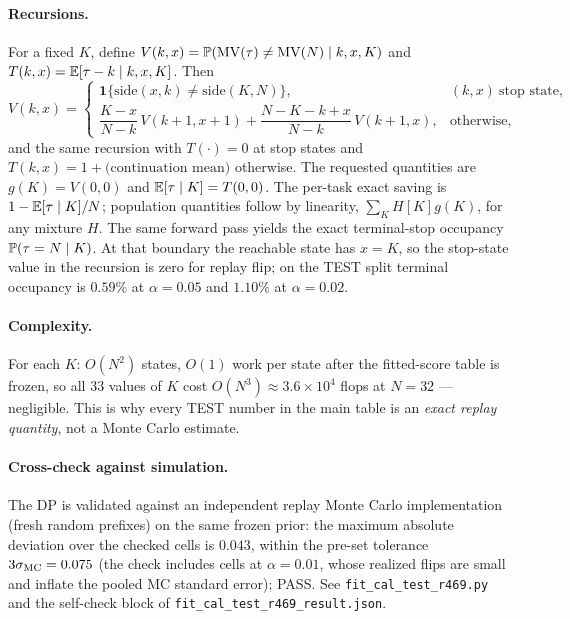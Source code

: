 \paragraph{Recursions.}
For a fixed $K$, define $V(k,x)=\P(\MV(\tau)\neq\MV(N)\mid k,x,K)$
and $T(k,x)=\E[\tau-k\mid k,x,K]$. Then
\[
V(k,x)=
\begin{cases}
\mathbf 1\{\mathrm{side}(x,k)\neq\mathrm{side}(K,N)\}, & (k,x)\ \text{stop state},\\[4pt]
\dfrac{K-x}{N-k}\,V(k+1,x+1)+\dfrac{N-K-k+x}{N-k}\,V(k+1,x), & \text{otherwise},
\end{cases}
\]
and the same recursion with
$T(\cdot)=0$ at stop states and $T(k,x)=1+\text{(continuation mean)}$
otherwise. The requested quantities are $g(K)=V(0,0)$ and
$\E[\tau\mid K]=T(0,0)$. The per-task exact saving is
$1-\E[\tau\mid K]/N$; population quantities follow by linearity,
$\sum_K H[K]g(K)$, for any mixture $H$. The same forward pass yields the
exact terminal-stop occupancy $\P(\tau=N\mid K)$.  At that boundary the
reachable state has $x=K$, so the stop-state value in the recursion is zero
for replay flip; on the TEST split terminal occupancy is $0.59\%$ at
$\alpha=0.05$ and $1.10\%$ at $\alpha=0.02$.

\paragraph{Complexity.}
For each $K$: $O(N^2)$ states, $O(1)$ work per state after the
fitted-score table is frozen, so all 33 values of $K$ cost
$O(N^3)\approx 3.6\times 10^4$ flops at $N=32$ --- negligible. This is
why every TEST number in the main table is an \emph{exact replay
quantity}, not a Monte Carlo estimate.

\paragraph{Cross-check against simulation.}
The DP is validated against an independent replay Monte Carlo
implementation (fresh random prefixes) on the same frozen prior: the
maximum absolute deviation over the checked cells is $0.043$, within the
pre-set tolerance $3\sigma_{\rm MC}=0.075$ (the check includes cells at
$\alpha=0.01$, whose realized flips are small and inflate the pooled MC
standard error); PASS. See \texttt{fit\_cal\_test\_r469.py} and the
self-check block of \texttt{fit\_cal\_test\_r469\_result.json}.
